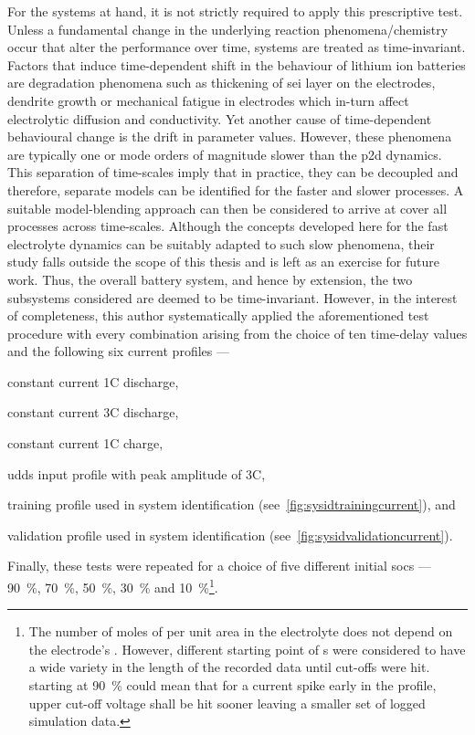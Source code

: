 For  the  systems   at  hand,  it  is  not  strictly   required  to  apply  this
prescriptive  test.  Unless a  fundamental  change  in the  underlying  reaction
phenomena/chemistry  occur that  alter the  performance over  time, systems  are
treated  as time-invariant.  Factors  that induce  time-dependent  shift in  the
behaviour of lithium ion batteries  are degradation phenomena such as thickening
of \gls{sei} layer  on the electrodes, dendrite growth or  mechanical fatigue in
electrodes  which in-turn  affect electrolytic  diffusion and  conductivity. Yet
another cause  of time-dependent  behavioural change is  the drift  in parameter
values. However, these  phenomena are typically one or mode  orders of magnitude
slower than  the \gls{p2d} dynamics.  This separation of
time-scales  imply  that in  practice,  they  can  be decoupled  and  therefore,
separate  models can  be  identified  for the  faster  and  slower processes.  A
suitable model-blending approach  can then be considered to arrive  at cover all
processes across time-scales. Although the  concepts developed here for the fast
electrolyte dynamics can be suitably adapted to such slow phenomena, their study
falls outside  the scope of this  thesis and is  left as an exercise  for future
work.  Thus,  the overall  battery  system,  and  hence  by extension,  the  two
subsystems considered are deemed to  be time-invariant. However, in the interest
of  completeness, this  author  systematically applied  the aforementioned  test
procedure  with every  combination arising  from  the choice  of ten  time-delay
values and the following six current profiles ---
\begin{enumerate*}[label=\emph{\alph*})]
    \item constant current 1C discharge,
    \item constant current 3C discharge,
    \item constant current 1C charge,
    \item \gls{udds} input profile with peak amplitude of 3C,
    \item training profile used in system identification (see~\cref{fig:sysidtrainingcurrent}), and
    \item validation profile used in system identification (see~\cref{fig:sysidvalidationcurrent}).
\end{enumerate*}
Finally,  these tests  were  repeated for  a choice  of  five different  initial
\glspl{soc}   ---   \SI{90}{\percent},   \SI{70}{\percent},   \SI{50}{\percent},
\SI{30}{\percent}  and \SI{10}{\percent}\footnote{\label{fn:socstart}The  number
of  moles  of   per  unit  area  in  the  electrolyte does  not  depend
on  the  electrode's .  However,  different  starting point  of
s were considered  to have a wide variety in  the length of the
recorded  data until  cut-offs  were hit.  \eg{}  starting at  \SI{90}{\percent}
 could  mean that  for a  current spike  early in  the profile,
upper  cut-off voltage  shall be  hit  sooner leaving  a smaller  set of  logged
simulation data.}.

